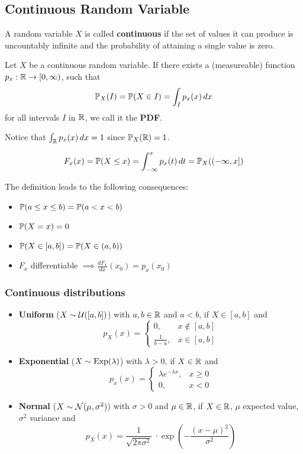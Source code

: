 \pagebreak
\subsection{Continuous Random Variable}
A random variable \(X\) is called \textbf{continuous} if the set of values it can produce is uncountably infinite and the probability of attaining a single value is zero.

\begin{cdefinition*}
  Let \(X\) be a continuous random variable. If there exists a (measureable) function \(p_x: \R \to [0, \infty)\), such that
  \[\P_X(I) = \P(X \in I) = \int_I p_x(x) \,dx\]
  for all intervals \(I\) in \(\R\), we call it the \textbf{PDF}.
\end{cdefinition*}

Notice that \(\int_\R p_x(x) \, dx = 1\) since \(\P_X(\R) = 1\).

\begin{cdefinition*}
  \[F_x(x) = \P(X \leq x) = \int_{-\infty}^x p_x(t) \,dt = \P_X((-\infty, x])\]
\end{cdefinition*}
The definition leads to the following consequences:
\begin{itemize}
  \item \(\P(a \leq x \leq b) = \P(a < x < b)\)
  \item \(\P(X = x) = 0\)
  \item \(\P(X \in [a, b]) = \P(X \in (a, b))\)
  \item \(F_x\) differentiable \(\implies \frac{dF_x}{dx}(x_0) = p_x(x_0)\)
\end{itemize}

\subsubsection{Continuous distributions}
\begin{itemize}
  \item \textbf{Uniform} (\(X \sim \Unif([a, b])\)) with \(a, b \in \R\) and \(a < b\), if \(X \in [a, b]\) and
  \[p_X(x) = \begin{cases}
    0, & x \notin [a, b] \\
    \frac{1}{b - a}, & x \in [a, b]
  \end{cases}\]

  \item \textbf{Exponential} (\(X \sim \Exp(\lambda)\)) with \(\lambda > 0\), if \(X \in \R\) and
  \[p_x(x) = \begin{cases}
    \lambda e^{-\lambda x}, & x \geq 0 \\
    0, & x < 0
  \end{cases}\]

  \item \textbf{Normal} (\(X \sim \Normal(\mu, \sigma^2)\)) with \(\sigma > 0\) and \(\mu \in \R\), if \(X \in \R\), \(\mu\) expected value, \(\sigma^2\) variance and
  \[p_X(x) = \frac{1}{\sqrt{2 \pi \sigma^2}}\ \cdot \exp(-\frac{(x - \mu)^2}{\sigma^2})\]
\end{itemize}
